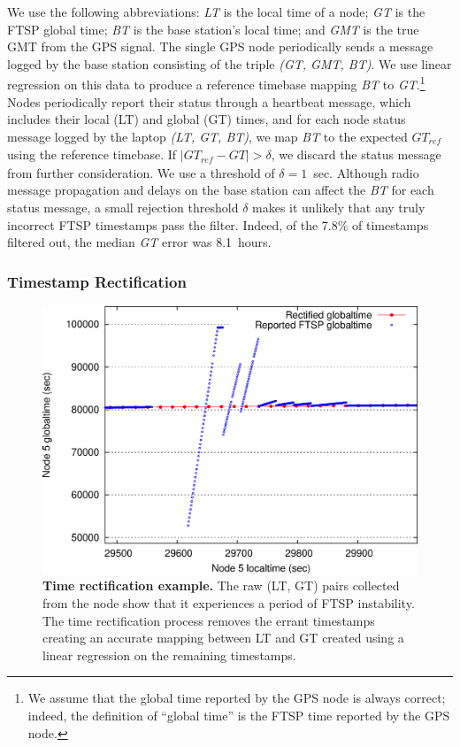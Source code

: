 We use the following abbreviations: {\em LT} is the local time of a node;
{\em GT} is the FTSP global time; {\em BT} is the base station's local time;
and {\em GMT} is the true GMT from the GPS signal.  The single GPS node
periodically sends a message logged by the base station consisting of the
triple {\em (GT, GMT, BT)}.  We use linear regression on this data to produce
a reference timebase mapping {\em BT} to {\em GT}.\footnote{We assume that
the global time reported by the GPS node is always correct; indeed, the
definition of ``global time'' is the FTSP time reported by the GPS node.}
Nodes periodically report their status through a heartbeat message, which
includes their local (LT) and global (GT) times, and for each node status
message logged by the laptop {\em (LT, GT, BT)}, we map {\em BT} to the
expected $\mathit{GT}_{\mathit{ref}}$ using the reference timebase. If $ \mid
\mathit{GT}_{\mathit{ref}} - \mathit{GT} \mid > \delta$, we discard the
status message from further consideration.  We use a threshold of $\delta =
1$~sec.  Although radio message propagation and delays on the base station
can affect the {\em BT} for each status message, a small rejection threshold
$\delta$ makes it unlikely that any truly incorrect FTSP timestamps pass the
filter. Indeed, of the 7.8\% of timestamps filtered out, the median {\em GT}
error was 8.1~hours.


\subsubsection{Timestamp Rectification}
\label{section-timerectification}

\begin{figure}[t]
\begin{center}
\includegraphics[width=\hsize]{./figs/OSDI2006/2006-TimingRectificationExample.eps}
\end{center}
\caption{{\bf Time rectification example.}
The raw (LT, GT) pairs collected from the node show that it experiences a
period of FTSP instability.  The time rectification process removes the
errant timestamps creating an accurate mapping between LT and GT created
using a linear regression on the remaining timestamps.}
\label{fig-timingrectificationexample}
\end{figure}


